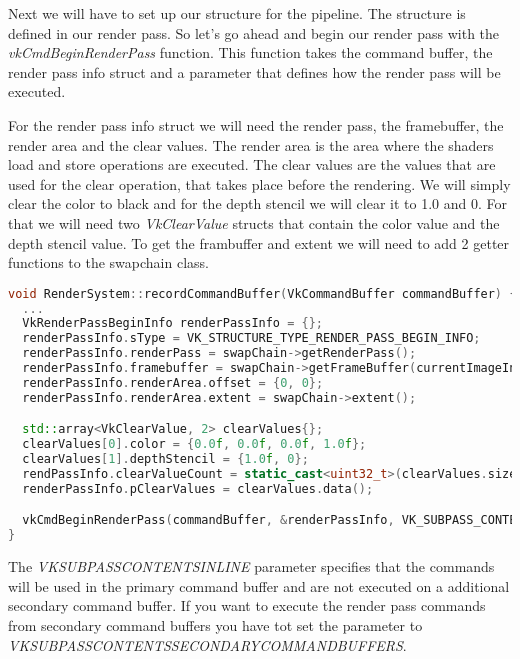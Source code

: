 \documentclass[12pt]{report} \usepackage{preamble}
\begin{document}
Next we will have to set up our structure for the pipeline. The structure is defined in our render pass. So let's go ahead and
begin our render pass with the \textit{vkCmdBeginRenderPass} function. This function takes the command buffer, the render pass
info struct and a parameter that defines how the render pass will be executed.

For the render pass info struct we will need the render pass, the framebuffer, the render area and the clear values. The render area
is the area where the shaders load and store operations are executed. The clear values are the values that are used for the clear
operation, that takes place before the rendering. We will simply clear the color to black and for the depth stencil we will clear it
to 1.0 and 0. For that we will need two \textit{VkClearValue} structs that contain the color value and the depth stencil value.
To get the frambuffer and extent we will need to add 2 getter functions to the swapchain class.

\begin{lstlisting}[language=C++]
void RenderSystem::recordCommandBuffer(VkCommandBuffer commandBuffer) {
  ...
  VkRenderPassBeginInfo renderPassInfo = {};
  renderPassInfo.sType = VK_STRUCTURE_TYPE_RENDER_PASS_BEGIN_INFO;
  renderPassInfo.renderPass = swapChain->getRenderPass();
  renderPassInfo.framebuffer = swapChain->getFrameBuffer(currentImageIndex);
  renderPassInfo.renderArea.offset = {0, 0};
  renderPassInfo.renderArea.extent = swapChain->extent();

  std::array<VkClearValue, 2> clearValues{};
  clearValues[0].color = {0.0f, 0.0f, 0.0f, 1.0f};
  clearValues[1].depthStencil = {1.0f, 0};
  rendPassInfo.clearValueCount = static_cast<uint32_t>(clearValues.size());
  renderPassInfo.pClearValues = clearValues.data();

  vkCmdBeginRenderPass(commandBuffer, &renderPassInfo, VK_SUBPASS_CONTENTS_INLINE);
}
\end{lstlisting}

The \textit{VK\textunderscore SUBPASS\textunderscore CONTENTS\textunderscore INLINE} parameter specifies that the commands will be
used in the primary command buffer and are not executed on a additional secondary command buffer. If you want to execute the render pass
commands from secondary command buffers you have tot set the parameter to \\
\textit{VK\textunderscore SUBPASS\textunderscore CONTENTS\textunderscore SECONDARY\textunderscore COMMAND\textunderscore BUFFERS}.
\end{document}
